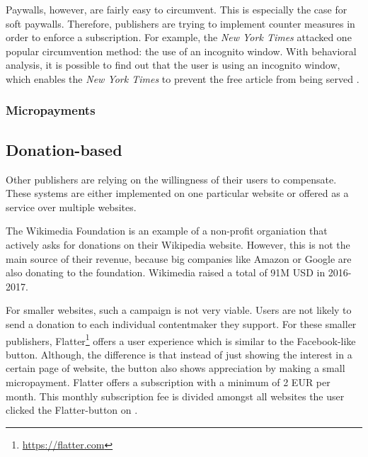 
Paywalls, however, are fairly easy to circumvent. This is especially the case for soft paywalls. Therefore, publishers are trying to implement counter measures in order to enforce a subscription. For example, the \textit{New York Times} attacked one popular circumvention method: the use of an incognito window. With behavioral analysis, it is possible to find out that the user is using an incognito window, which enables the \textit{New York Times} to prevent the free article from being served \cite{troupson2015yes}.  

\subsubsection{Micropayments}



\subsection{Donation-based}

Other publishers are relying on the willingness of their users to compensate. These systems are either implemented on one particular website or offered as a service over multiple websites. 

The Wikimedia Foundation is an example of a non-profit organiation that actively asks for donations on their Wikipedia website. However, this is not the main source of their revenue, because big companies like Amazon or Google are also donating to the foundation. Wikimedia raised a total of 91M USD in 2016-2017. \cite{wikimediadonation}

For smaller websites, such a campaign is not very viable. Users are not likely to send a donation to each individual contentmaker they support. For these smaller publishers, Flatter\footnote{\url{https://flatter.com}} offers a user experience which is similar to the Facebook-like button. Although, the difference is that instead of just showing the interest in a certain page of website, the button also shows appreciation by making a small micropayment. Flatter offers a subscription with a minimum of 2 EUR per month. This monthly subscription fee is divided amongst all websites the user clicked the Flatter-button on \cite{loll2010flattr}.







